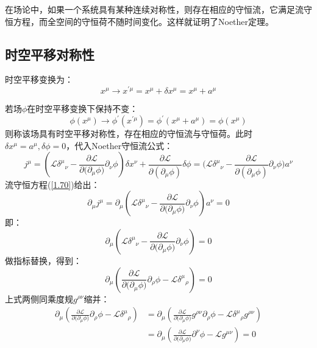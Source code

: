 \documentclass{book}
\begin{document}
在场论中，如果一个系统具有某种连续对称性，则存在相应的守恒流，它满足流守恒方程，而全空间的守恒荷不随时间变化。这样就证明了Noether定理。
\subsection{时空平移对称性}
时空平移变换为：
\begin{equation}
x^\mu\to x^{\prime\mu}=x^\mu+\delta x^\mu=x^\mu+a^\mu	
\end{equation}


若场$\phi$在时空平移变换下保持不变：
\begin{equation}
	\phi(x^\mu)\to \phi^\prime(x^{\prime\mu})=\phi^\prime(x^\mu+a^\mu)=\phi(x^\mu)
\end{equation}
则称该场具有时空平移对称性，存在相应的守恒流与守恒荷。此时$\delta x^\mu=a^\mu,\delta \phi=0$，代入Noether守恒流公式：
\begin{equation}
	j^\mu=\left(\mathscr{L}\delta^\mu{}_\nu-\frac{\partial\mathscr{L}}{\partial\big(\partial_\mu\phi\big)}\partial_\nu\phi\right)\delta x^\nu+\frac{\partial\mathscr{L}}{\partial(\partial_\mu\phi)}\delta\phi=\Bigg(\mathscr{L}\delta^\mu{}_\nu-\frac{\partial\mathscr{L}}{\partial(\partial_\mu\phi)}\partial_\nu\phi\Bigg)a^\nu
\end{equation}
流守恒方程(\ref{1.70})给出：
\begin{equation}
	\partial_\mu j^\mu=\partial_\mu\left(\mathscr{L}\delta^\mu{}_\nu-\frac{\partial\mathscr{L}}{\partial\big(\partial_\mu\phi\big)}\partial_\nu\phi\right)a^\nu=0
\end{equation}
即：
\begin{equation}
	\partial_\mu\left(\mathscr{L}\delta^\mu{}_\nu-\frac{\partial\mathscr{L}}{\partial\big(\partial_\mu\phi\big)}\partial_\nu\phi\right)=0
\end{equation}
做指标替换，得到：
\begin{equation}
	\partial_\mu\left(\frac{\partial\mathscr{L}}{\partial\big(\partial_\mu\phi\big)}\partial_\rho\phi-\mathscr{L}\delta^\mu{}_\rho\right)=0
\end{equation}
上式两侧同乘度规$g^{\rho\nu}$缩并：
\begin{equation}
	\begin{aligned}
		\partial_\mu\left(\frac{\partial\mathscr{L}}{\partial\big(\partial_\mu\phi\big)}\partial_\rho\phi-\mathscr{L}\delta^\mu{}_\rho\right)&=\partial_\mu\left(\frac{\partial\mathscr{L}}{\partial\big(\partial_\mu\phi\big)}g^{\rho\nu}\partial_\rho\phi-\mathscr{L}\delta^\mu{}_\rho g^{\rho\nu}\right)\\&=\partial_\mu\left(\frac{\partial\mathscr{L}}{\partial\big(\partial_\mu\phi\big)}\partial^\nu\phi-\mathscr{L}g^{\mu\nu}\right)=0
	\end{aligned}
	\label{1.80}
\end{equation}
\end{document}
